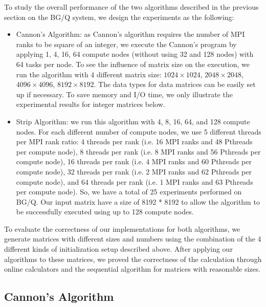 \documentclass[conference]{IEEEtran}
\begin{document}
To study the overall performance of the two algorithms described in the previous section on the BG/Q system, we design the experiments as the following: 
\begin{itemize}
    \item Cannon's Algorithm: as Cannon's algorithm requires the number of MPI ranks to be square of an integer, we execute the Cannon's program by applying 1, 4, 16, 64 compute nodes (without using 32 and 128 nodes) with 64 tasks per node. To see the influence of matrix size on the execution, we run the algorithm with 4 different matrix size: $1024\times1024$, $2048\times2048$, $4096\times4096$, $8192\times8192$. The data types for data matrices can be easily set up if necessary. To save memory and I/O time, we only illustrate the experimental results for integer matrices below.
    \item Strip Algorithm: we run this algorithm with 4, 8, 16, 64, and 128 compute nodes. For each different number of compute nodes, we use 5 different threads per MPI rank ratio: 4 threads per rank (i.e. 16 MPI ranks and 48 Pthreads per compute node), 8 threads per rank (i.e. 8 MPI ranks and 56 Pthreads per compute node), 16 threads per rank (i.e. 4 MPI ranks and 60 Pthreads per compute node), 32 threads per rank (i.e. 2 MPI ranks and 62 Pthreads per compute node), and 64 threads per rank (i.e. 1 MPI ranks and 63 Pthreads per compute node). So, we have a total of 25 experiments performed on BG/Q. Our input matrix have a size of 8192 * 8192 to allow the algorithm to be successfully executed using up to 128 compute nodes. 
\end{itemize}

To evaluate the correctness of our implementations for both algorithms, we generate matrices with different sizes and numbers using the combination of the 4 different kinds of initialization setup described above. After applying our algorithms to these matrices, we proved the correctness of the calculation through online calculators and the sequential algorithm for matrices with reasonable sizes. 

\subsection{Cannon's Algorithm}
\end{document}
